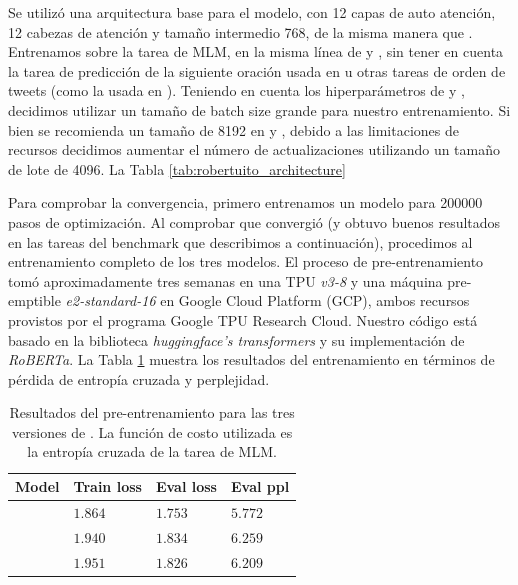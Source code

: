 Se utilizó una arquitectura \roberta{} base para el modelo, con 12 capas de auto atención, 12 cabezas de atención y tamaño intermedio 768, de la misma manera que \bertweet{}. Entrenamos \robertuito{} sobre la tarea de MLM, en la misma línea de \roberta{} y \bertweet{}, sin tener en cuenta la tarea de predicción de la siguiente oración usada en \bert{} u otras tareas de orden de tweets (como la usada en \citet{gonzalez2021twilbert}). Teniendo en cuenta los hiperparámetros de \roberta{} y \bertweet{}, decidimos utilizar un tamaño de batch size grande para nuestro entrenamiento. Si bien se recomienda un tamaño de \num{8192} en \citet{liu2019roberta} y \citet{dat2020bertweet}, debido a las limitaciones de recursos decidimos aumentar el número de actualizaciones utilizando un tamaño de lote de \num{4096}. La Tabla \ref{tab:robertuito_architecture}

Para comprobar la convergencia, primero entrenamos un modelo para \num{200000} pasos de optimización. Al comprobar que convergió (y obtuvo buenos resultados en las tareas del benchmark que describimos a continuación), procedimos al entrenamiento completo de los tres modelos. El proceso de pre-entrenamiento tomó aproximadamente tres semanas en una TPU \emph{v3-8} y una máquina pre-emptible \emph{e2-standard-16} en Google Cloud Platform (GCP), ambos recursos provistos por el programa Google TPU Research Cloud. Nuestro código está basado en la biblioteca \emph{huggingface's transformers} \cite{wolf-etal-2020-transformers} y su implementación de \emph{RoBERTa}. La Tabla \ref{tab:training_results} muestra los resultados del entrenamiento en términos de pérdida de entropía cruzada y perplejidad.

\begin{table}[h]
    \centering
    \begin{tabular}{l l l l}
        Model      & Train loss & Eval loss & Eval ppl \\
        \hline
        \cased{}   & $1.864$    & $1.753$   & $5.772$  \\
        \uncased{} & $1.940$    & $1.834$   & $6.259$  \\
        \deacc{}   & $1.951$    & $1.826$   & $6.209$  \\
        \hline
    \end{tabular}
    \caption{Resultados del pre-entrenamiento para las tres versiones de \robertuito{}. La función de costo utilizada es la entropía cruzada de la tarea de MLM.}
    \label{tab:training_results}
\end{table}


